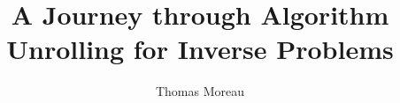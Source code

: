 \documentclass{beamer}
\author{Thomas Moreau}
\institute{\\ INRIA Saclay - MIND Team}
\title{
	A Journey through Algorithm Unrolling for Inverse Problems
}
\begin{document}
\begin{frame}
	\titlepage
\end{frame}












\end{document}
